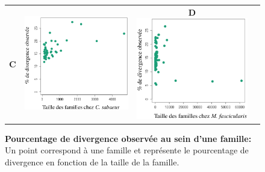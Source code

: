 \documentclass[12pt,a4paper]{article}
\begin{document}
\begin{figure}
\begin{tabular}{cccc}
		\textbf{C} & \includegraphics[scale=0.3]{img/similarity_sabaeus.png} & \textbf{D} \includegraphics[scale=0.3]{img/similarity_fascicularis.png} \\
	\end{tabular}
	\caption{\textbf{Pourcentage de divergence observée au sein d'une famille:}
	Un point correspond à une famille et représente le pourcentage de divergence en fonction de la taille de la famille.
	\label{fig:motif}
		} 
\end{figure}
\end{document}
